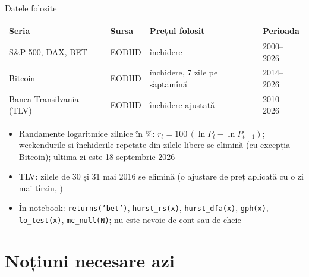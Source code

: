 \begin{frame}{Datele folosite}
\itemsize{\small}
\begin{center}
\footnotesize
\begin{tabular}{llll}
\toprule
\textbf{Seria} & \textbf{Sursa} & \textbf{Prețul folosit} & \textbf{Perioada} \\
\midrule
S\&P 500, DAX, BET & EODHD & închidere & 2000--2026 \\
Bitcoin & EODHD & închidere, 7 zile pe săptămînă & 2014--2026 \\
Banca Transilvania (TLV) & EODHD & închidere ajustată & 2010--2026 \\
\bottomrule
\end{tabular}
\end{center}
\begin{itemize}
    \item Randamente logaritmice zilnice în \%: $r_t = 100\,(\ln P_t - \ln P_{t-1})$; weekendurile și închiderile repetate din zilele libere se elimină (cu excepția Bitcoin); ultima zi este 18 septembrie 2026
    \item TLV: zilele de 30 și 31 mai 2016 se elimină (o ajustare de preț aplicată cu o zi mai tîrziu, )
    \item În notebook: \texttt{returns('bet')}, \texttt{hurst\_rs(x)}, \texttt{hurst\_dfa(x)}, \texttt{gph(x)}, \texttt{lo\_test(x)}, \texttt{mc\_null(N)}; nu este nevoie de cont sau de cheie
\end{itemize}
\end{frame}


\section{Noțiuni necesare azi}

